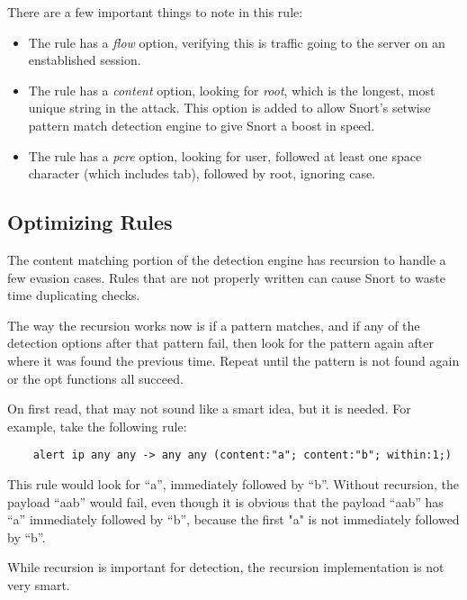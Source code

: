 \documentclass[english]{report}
\begin{document}
There are a few important things to note in this rule:

\begin{itemize}

\item The rule has a \emph{flow} option, verifying this is traffic going to the
server on an enstablished session.

\item The rule has a \emph{content} option, looking for \emph{root}, which is
the longest, most unique string in the attack.  This option is added to allow
Snort's setwise pattern match detection engine to give Snort a boost in speed.

\item The rule has a \emph{pcre} option, looking for user, followed at least
one space character (which includes tab), followed by root, ignoring case.

\end{itemize}

\subsection{Optimizing Rules}

The content matching portion of the detection engine has recursion to handle a
few evasion cases.  Rules that are not properly written can cause Snort to
waste time duplicating checks.

The way the recursion works now is if a pattern matches, and if any of the
detection options after that pattern fail, then look for the pattern again
after where it was found the previous time.  Repeat until the pattern is not
found again or the opt functions all succeed.

On first read, that may not sound like a smart idea, but it is needed.  For
example, take the following rule:

\begin{verbatim}
    alert ip any any -> any any (content:"a"; content:"b"; within:1;)
\end{verbatim}

This rule would look for ``a'', immediately followed by ``b''.  Without
recursion, the payload ``aab'' would fail, even though it is obvious that the
payload ``aab'' has ``a'' immediately followed by ``b'', because the first "a"
is not immediately followed by ``b''.

While recursion is important for detection, the recursion implementation is not
very smart.
\end{document}

